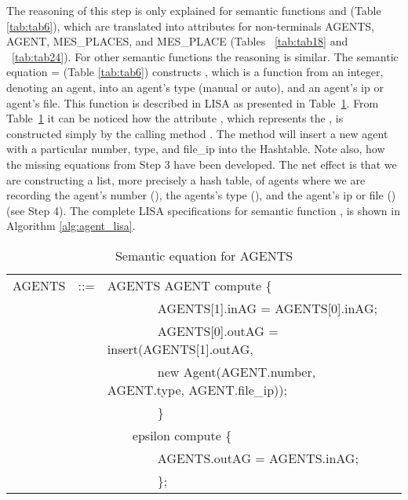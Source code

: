 \documentclass[preprint, prX]{revtex4}
\begin{document}
The reasoning of this step is only explained for semantic functions  and  (Table \ref{tab:tab6}), which are translated into attributes for non-terminals AGENTS, AGENT, MES\_PLACES, and MES\_PLACE (Tables ~\ref{tab:tab18} and ~\ref{tab:tab24}). For other semantic functions the reasoning is similar.
The semantic equation  =   (Table \ref{tab:tab6}) constructs , which is a function from an integer, denoting an agent, into an agent's type (manual or auto), and an agent's ip or agent's file. This function is described in LISA  as presented in Table~\ref{tab:tab25a}. From Table~\ref{tab:tab25a} it can be noticed how the attribute , which represents the , is constructed simply by the calling method . The method  will insert a new agent with a particular number, type, and file\_ip into the Hashtable. Note also, how the missing equations from Step 3 have been developed.
The net effect is that we are constructing a list, more precisely a hash table, of agents where we are recording the agent's number (), the agents's type (), and the agent's ip or file () (see Step 4). The complete LISA specifications for semantic function , is shown in Algorithm \ref{alg:agent_lisa}.

\begin{table}[htb]           \caption{Semantic equation for AGENTS}
\label{tab:tab25a}
\vspace{-5mm}
\footnotesize
\begin{center}
\begin{tabular}{ | l  l  l | }
\hline
AGENTS & ::= & AGENTS  AGENT compute \{ \\
 & & \ \ \ \ \ \ \ \ AGENTS[1].inAG = AGENTS[0].inAG; \\
 & & \ \ \ \ \ \ \ \ AGENTS[0].outAG = insert(AGENTS[1].outAG, \\
 & & \ \ \ \ \ \ \ \ new Agent(AGENT.number, AGENT.type, AGENT.file\_ip)); \\
 & & \ \ \ \ \ \ \ \ \} \\
 & & \ \ \ \  epsilon compute \{ \\
 & & \ \ \ \ \ \ \ \ AGENTS.outAG = AGENTS.inAG; \\
 & & \ \ \ \ \ \ \ \ \}; \\
\hline
\end{tabular}
\end{center}
\normalsize
\vspace{-5mm}
\end{table}
\end{document}
